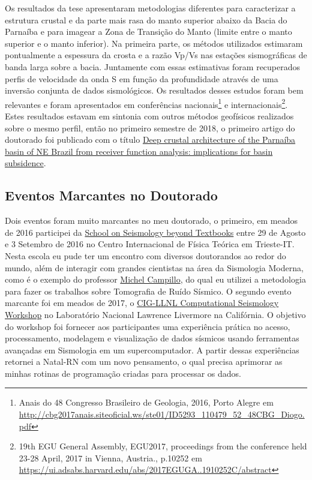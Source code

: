\documentclass[10pt,a4paper,oneside]{book}
\begin{document}
Os resultados da tese apresentaram metodologias diferentes para caracterizar a estrutura crustal e da parte mais rasa do manto superior abaixo da Bacia do Parnaíba e para imagear a Zona de Transição do Manto (limite entre o manto superior e o manto inferior). Na primeira parte, os métodos utilizados estimaram pontualmente a espessura da crosta e a razão Vp/Vs nas estações sismográficas de banda larga sobre a bacia. Juntamente com essas estimativas foram recuperados perfis de velocidade da onda S em função da profundidade através de uma inversão conjunta de dados sismológicos. Os resultados desses estudos foram bem relevantes e foram apresentados em conferências nacionais\footnote{Anais do 48 Congresso Brasileiro de Geologia, 2016, Porto Alegre em \url{http://cbg2017anais.siteoficial.ws/ste01/ID5293_110479_52_48CBG_Diogo.pdf}} e internacionais\footnote{19th EGU General Assembly, EGU2017, proceedings from the conference held 23-28 April, 2017 in Vienna, Austria., p.10252 em \url{https://ui.adsabs.harvard.edu/abs/2017EGUGA..1910252C/abstract}}. Estes resultados estavam em sintonia com outros métodos geofísicos realizados sobre o mesmo perfil, então no primeiro semestre de 2018, o primeiro artigo do doutorado foi publicado com o título \href{https://doi.org/10.1144/SP472.8}{Deep crustal architecture of the Parnaíba basin of NE Brazil from receiver function analysis: implications for basin subsidence}.

\subsection{Eventos Marcantes no Doutorado}
\label{sec_ev_doc}

Dois eventos foram muito marcantes no meu doutorado, o primeiro, em meados de 2016 participei da \href{https://indico.ictp.it/event/7615/material/11/0.jpg}{School on Seismology beyond Textbooks} entre 29 de Agosto e 3 Setembro de 2016 no Centro Internacional de Física Teórica em Trieste-IT. Nesta escola eu pude ter um encontro com diversos doutorandos ao redor do mundo, além de interagir com grandes cientistas na área da Sismologia Moderna, como é o exemplo do professor \href{https://scholar.google.fr/citations?user=ZCRP01AAAAAJ&hl=fr}{Michel Campillo}, do qual eu utilizei a metodologia para fazer os trabalhos sobre Tomografia de Ruído Sísmico. O segundo evento marcante foi em meados de 2017, o \href{https://geodynamics.org/events/details/218}{CIG-LLNL Computational Seismology Workshop} no Laboratório Nacional Lawrence Livermore na Califórnia. O objetivo do workshop foi fornecer aos participantes uma experiência prática no acesso, processamento, modelagem e visualização de dados sísmicos usando ferramentas avançadas em Sismologia em um supercomputador. A partir dessas experiências retornei a Natal-RN com um novo pensamento, o qual precisa aprimorar as minhas rotinas de programação criadas para processar os dados. 
\end{document}
